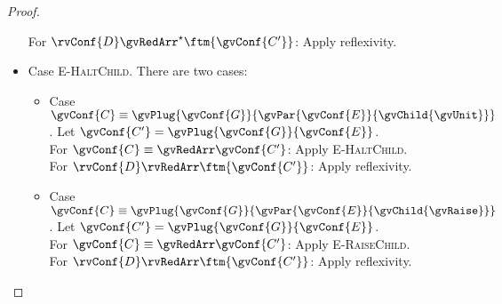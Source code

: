 \begin{proof}
\begin{itemize}
    For $\rvConf{D}\gvRedArr^{\star}\ftm{\gvConf{C'}}$: Apply reflexivity.
  \item
    Case \textsc{E-HaltChild}.
    There are two cases:
    \begin{itemize}
    \item
      Case $\gvConf{C}\equiv\gvPlug{\gvConf{G}}{\gvPar{\gvConf{E}}{\gvChild{\gvUnit}}}$. Let $\gvConf{C'}=\gvPlug{\gvConf{G}}{\gvConf{E}}$. \\ For $\gvConf{C}\equiv\gvRedArr\gvConf{C'}$: Apply \textsc{E-HaltChild}. \\ For $\rvConf{D}\rvRedArr\ftm{\gvConf{C'}}$: Apply reflexivity.
    \item
      Case $\gvConf{C}\equiv\gvPlug{\gvConf{G}}{\gvPar{\gvConf{E}}{\gvChild{\gvRaise}}}$. Let $\gvConf{C'}=\gvPlug{\gvConf{G}}{\gvConf{E}}$. \\ For $\gvConf{C}\equiv\gvRedArr\gvConf{C'}$: Apply \textsc{E-RaiseChild}. \\ For $\rvConf{D}\rvRedArr\ftm{\gvConf{C'}}$: Apply reflexivity.
    \end{itemize}
  \end{itemize}
\end{proof}
